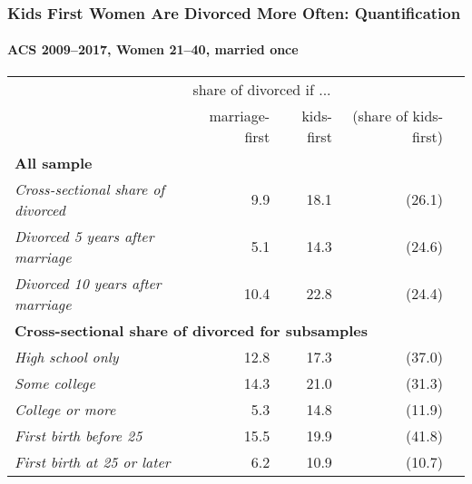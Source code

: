 \documentclass[aspectratio=169]{beamer}
\begin{document}
\begin{frame}[plain,label=emp-table]
\frametitle{Kids First Women Are Divorced More Often: Quantification}
\framesubtitle{ACS 2009--2017, Women 21--40, married once}
\begin{center}
\begin{tabular}{l r r r r }
\hline
& \multicolumn{2}{c}{share of divorced if ... }&  \\
&  marriage-first & kids-first & (share of kids-first) &  \\\hline
\multicolumn{5}{l}{\textbf{All sample}} \\\hline
\textit{Cross-sectional share of divorced} &  9.9 & 18.1 & (26.1) \\
\textit{Divorced 5 years after marriage} &  5.1 & 14.3  & (24.6) \\
\textit{Divorced 10 years after marriage} & 10.4 & 22.8 & (24.4) \\\hline
\multicolumn{5}{l}{\textbf{Cross-sectional share of divorced for subsamples}} \\\hline
\textit{High school only} &  12.8 & 17.3 & (37.0) \\
\textit{Some college} & 14.3 & 21.0 & (31.3) \\
\textit{College or more} &   5.3 & 14.8 & (11.9) \\\hline
\textit{First birth before 25} & 15.5 & 19.9 & (41.8) \\
\textit{First birth at 25 or later} &  6.2 & 10.9 & (10.7)  \\\hline
\end{tabular}
\end{center}
\hyperlink{dt_more}{} 
\end{frame}
\end{document}

